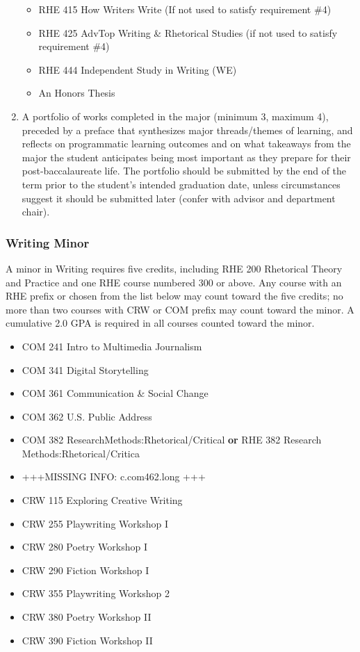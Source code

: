 \documentclass[
  letterpaper,
]{scrbook}
\providecommand{\tightlist}{%
  \setlength{\itemsep}{0pt}\setlength{\parskip}{0pt}}
\begin{document}
\begin{enumerate}
  \begin{itemize}
  \tightlist
  \item
    RHE 415 How Writers Write (If not used to satisfy requirement \#4)
  \item
    RHE 425 AdvTop Writing \& Rhetorical Studies (if not used to satisfy
    requirement \#4)
  \item
    RHE 444 Independent Study in Writing (WE)
  \item
    An Honors Thesis
  \end{itemize}
\item
  A portfolio of works completed in the major (minimum 3, maximum 4),
  preceded by a preface that synthesizes major threads/themes of
  learning, and reflects on programmatic learning outcomes and on what
  takeaways from the major the student anticipates being most important
  as they prepare for their post-baccalaureate life. The portfolio
  should be submitted by the end of the term prior to the student's
  intended graduation date, unless circumstances suggest it should be
  submitted later (confer with advisor and department chair).
\end{enumerate}

\subsubsection{Writing Minor}\label{writing-minor}

A minor in Writing requires five credits, including RHE 200 Rhetorical
Theory and Practice and one RHE course numbered 300 or above. Any course
with an RHE prefix or chosen from the list below may count toward the
five credits; no more than two courses with CRW or COM prefix may count
toward the minor. A cumulative 2.0 GPA is required in all courses
counted toward the minor.

\begin{itemize}
\tightlist
\item
  COM 241 Intro to Multimedia Journalism
\item
  COM 341 Digital Storytelling
\item
  COM 361 Communication \& Social Change
\item
  COM 362 U.S. Public Address
\item
  COM 382 ResearchMethods:Rhetorical/Critical \textbf{or} RHE 382
  Research Methods:Rhetorical/Critica
\item
  +++MISSING INFO: c.com462.long +++
\item
  CRW 115 Exploring Creative Writing
\item
  CRW 255 Playwriting Workshop I
\item
  CRW 280 Poetry Workshop I
\item
  CRW 290 Fiction Workshop I
\item
  CRW 355 Playwriting Workshop 2
\item
  CRW 380 Poetry Workshop II
\item
  CRW 390 Fiction Workshop II
\end{itemize}
\end{document}
